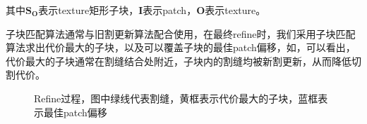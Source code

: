 \documentclass[11pt,a4paper]{article}
\begin{document}
其中$\mathbf{S}_{\mathbf{O}}$表示texture矩形子块，$\mathbf{I}$表示patch，$\mathbf{O}$表示texture。

子块匹配算法通常与旧割更新算法配合使用，在最终refine时，我们采用子块匹配算法求出代价最大的子块，以及可以覆盖子块的最佳patch偏移，如，可以看出，代价最大的子块通常在割缝结合处附近，子块内的割缝均被新割更新，从而降低切割代价。

\begin{figure}[H]
    \centering
    \caption{Refine过程，图中绿线代表割缝，黄框表示代价最大的子块，蓝框表示最佳patch偏移}
    \label{fig:refine_steps}
\end{figure}
\end{document}
